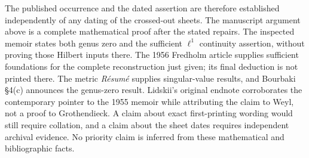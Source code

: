The published occurrence and the dated assertion are therefore established
independently of any dating of the crossed-out sheets. The manuscript
argument above is a complete mathematical proof after the stated repairs.
The inspected memoir states both genus zero and the sufficient $\ell^1$
continuity assertion, without proving those Hilbert inputs there. The
1956 Fredholm article supplies sufficient foundations for the complete
reconstruction just given; its final deduction is not printed there.
The metric \emph{R\'esum\'e} supplies singular-value results, and
Bourbaki \S4(c) announces the genus-zero result. Lidskii's original endnote
corroborates the contemporary pointer to the 1955 memoir while attributing
the claim to Weyl, not a proof to Grothendieck. A claim about exact
first-printing wording would still require collation, and a claim about
the sheet dates requires independent archival evidence. No priority claim
is inferred from these mathematical and bibliographic facts.
